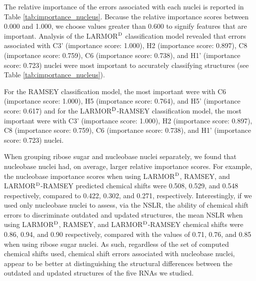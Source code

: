 \documentclass[fleqn,10pt]{wlscirep}
\begin{document}
The relative importance of the errors associated with each nuclei is reported in Table \ref{tab:importance_nucleus}. Because the relative importance scores between 0.000 and 1.000, we choose values greater than 0.600  to signify features that are important. Analysis of the LARMOR$^{\rm D}$ classification model revealed that errors associated with C3' (importance score: 1.000), H2 (importance score: 0.897), C8 (importance score: 0.759), C6 (importance score: 0.738), and H1' (importance score: 0.723) nuclei were most important to accurately classifying structures (see Table \ref{tab:importance_nucleus}). 

For the RAMSEY classification model, the most important were with C6 (importance score: 1.000), H5 (importance score: 0.764), and H5' (importance score: 0.617) and for the LARMOR$^{\rm D}$-RAMSEY classification model, the most important were with C3' (importance score: 1.000), H2 (importance score: 0.897), C8 (importance score: 0.759), C6 (importance score: 0.738), and H1' (importance score: 0.723) nuclei.

When grouping ribose sugar and nucleobase nuclei separately, we found that nucleobase nuclei had, on average, larger relative importance scores. For example, the nucleobase importance scores when using  LARMOR$^{\rm D}$, RAMSEY, and LARMOR$^{\rm D}$-RAMSEY predicted chemical shifts were  0.508, 0.529, and 0.548 respectively, compared to 0.422, 0.302, and 0.271, respectively. Interestingly, if we used only nucleobase nuclei to assess, via the NSLR, the ability of chemical shift errors to discriminate outdated and updated structures, the mean NSLR when using LARMOR$^{\rm D}$,  RAMSEY, and  LARMOR$^{\rm D}$-RAMSEY chemical shifts were 0.86, 0.94, and 0.90 respectively, compared with the values of 0.71, 0.76, and 0.85 when using ribose sugar nuclei. As such, regardless of the set of computed chemical shifts used, chemical shift errors associated with nucleobase nuclei, appear to be better at distinguishing the structural differences between the outdated and updated structures of the five RNAs we studied.
\end{document}
